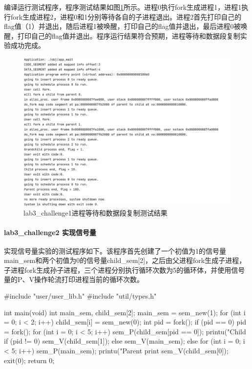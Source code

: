编译运行测试程序，程序测试结果如图\ref{fig:lab3-c1}所示。进程0执行fork生成进程1，进程1执行fork生成进程2，进程0和1分别等待各自的子进程退出。进程2首先打印自己的flag值（1）并退出，随后进程1被唤醒，打印自己的flag值并退出，最后进程0被唤醒，打印自己的flag值并退出。程序运行结果符合预期，进程等待和数据段复制实验成功完成。
\begin{figure}[!htbp]
    \centering
    \includegraphics[width = 14cm]{figure/lab3_c1_testresult.png}
    \caption{lab3_challenge1进程等待和数据段复制测试结果}
    \label{fig:lab3-c1}
\end{figure}

\paragraph{lab3_challenge2 实现信号量}
实现信号量实验的测试程序如下。该程序首先创建了一个初值为1的信号量main_sem和两个初值为0的信号量child_sem[2]，之后由父进程fork生成子进程，子进程fork生成孙子进程，三个进程分别执行循环次数为5的循环体，并使用信号量的P、V操作轮流打印进程当前的循环次数。
\begin{cppcode}
#include "user/user_lib.h"
#include "util/types.h"

int main(void) {
    int main_sem, child_sem[2];
    main_sem = sem_new(1); 
    for (int i = 0; i < 2; i++) child_sem[i] = sem_new(0);
    int pid = fork();
    if (pid == 0) {
        pid = fork();
        for (int i = 0; i < 5; i++) {
            sem_P(child_sem[pid == 0]);
            printu("Child%
            if (pid != 0) sem_V(child_sem[1]); else sem_V(main_sem);
        }
    } else {
        for (int i = 0; i < 5; i++) {
            sem_P(main_sem);
            printu("Parent print %
            sem_V(child_sem[0]);
        }
    }
    exit(0);
    return 0;
}
\end{cppcode}

